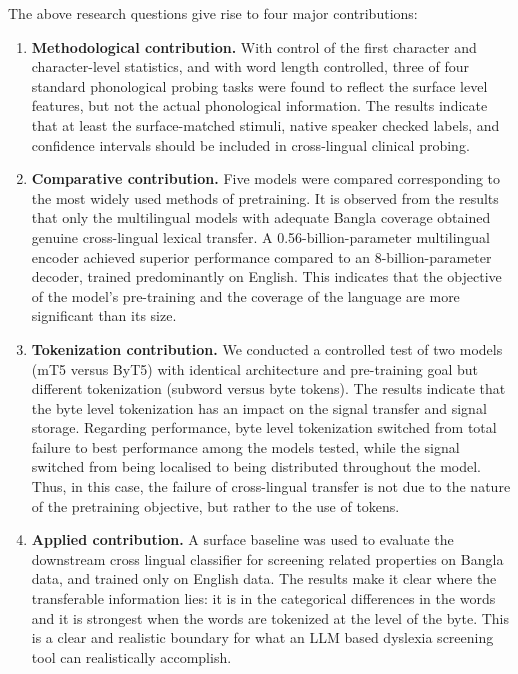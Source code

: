 \documentclass[preprint,12pt,authoryear]{elsarticle}
\begin{document}
The above research questions give rise to four major contributions:
\begin{enumerate}
\item \textbf{Methodological contribution.} With control of the first character and character-level statistics, and with word length controlled, three of four standard phonological probing tasks were found to reflect the surface level features, but not the actual phonological information. The results indicate that at least the surface-matched stimuli, native speaker checked labels, and confidence intervals should be included in cross-lingual clinical probing.
\item \textbf{Comparative contribution.} Five models were compared corresponding to the most widely used methods of pretraining. It is observed from the results that only the multilingual models with adequate Bangla coverage obtained genuine cross-lingual lexical transfer. A 0.56-billion-parameter multilingual encoder achieved superior performance compared to an 8-billion-parameter decoder, trained predominantly on English. This indicates that the objective of the model's pre-training and the coverage of the language are more significant than its size.
\item \textbf{Tokenization contribution.} We conducted a controlled test of two models (mT5 versus ByT5) with identical architecture and pre-training goal but different tokenization (subword versus byte tokens). The results indicate that the byte level tokenization has an impact on the signal transfer and signal storage. Regarding performance, byte level tokenization switched from total failure to best performance among the models tested, while the signal switched from being localised to being distributed throughout the model. Thus, in this case, the failure of cross-lingual transfer is not due to the nature of the pretraining objective, but rather to the use of tokens.
\item \textbf{Applied contribution.} A surface baseline was used to evaluate the downstream cross lingual classifier for screening related properties on Bangla data, and trained only on English data. The results make it clear where the transferable information lies: it is in the categorical differences in the words and it is strongest when the words are tokenized at the level of the byte. This is a clear and realistic boundary for what an LLM based dyslexia screening tool can realistically accomplish.
\end{enumerate}

\end{document}
